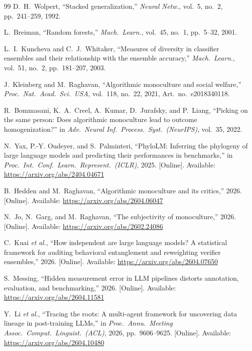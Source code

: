 \documentclass{ieeeaccess}
\theoremstyle{definition}
\theoremstyle{plain}
\begin{document}
\begin{thebibliography}{99}
 D.~H.~Wolpert, ``Stacked generalization,'' \emph{Neural
Netw.}, vol.~5, no.~2, pp.~241--259, 1992.

 L.~Breiman, ``Random forests,'' \emph{Mach.\ Learn.},
vol.~45, no.~1, pp.~5--32, 2001.

 L.~I.~Kuncheva and C.~J.~Whitaker, ``Measures of
diversity in classifier ensembles and their relationship with the ensemble
accuracy,'' \emph{Mach.\ Learn.}, vol.~51, no.~2, pp.~181--207, 2003.

 J.~Kleinberg and M.~Raghavan, ``Algorithmic monoculture
and social welfare,'' \emph{Proc.\ Nat.\ Acad.\ Sci.\ USA}, vol.~118, no.~22,
2021, Art.\ no.\ e2018340118.

 R.~Bommasani, K.~A.~Creel, A.~Kumar, D.~Jurafsky, and
P.~Liang, ``Picking on the same person: Does algorithmic monoculture lead to
outcome homogenization?'' in \emph{Adv.\ Neural Inf.\ Process.\ Syst.\
(NeurIPS)}, vol.~35, 2022.

 N.~Yax, P.-Y. Oudeyer, and S.~Palminteri, ``PhyloLM:
Inferring the phylogeny of large language models and predicting their performances
in benchmarks,'' in \emph{Proc.\ Int.\ Conf.\ Learn.\ Represent.\ (ICLR)}, 2025.
[Online]. Available: \url{https://arxiv.org/abs/2404.04671}

 B.~Hedden and M.~Raghavan, ``Algorithmic monoculture and
its critics,'' 2026. [Online]. Available: \url{https://arxiv.org/abs/2604.06047}

 N.~Jo, N.~Garg, and M.~Raghavan, ``The subjectivity of
monoculture,'' 2026. [Online]. Available: \url{https://arxiv.org/abs/2602.24086}

 C.~Kuai \emph{et al.}, ``How independent are large language
models? A statistical framework for auditing behavioral entanglement and
reweighting verifier ensembles,'' 2026. [Online]. Available:
\url{https://arxiv.org/abs/2604.07650}

 S.~Messing, ``Hidden measurement error in LLM pipelines
distorts annotation, evaluation, and benchmarking,'' 2026. [Online]. Available:
\url{https://arxiv.org/abs/2604.11581}

 Y.~Li \emph{et al.}, ``Tracing the roots: A multi-agent
framework for uncovering data lineage in post-training LLMs,'' in \emph{Proc.\
Annu.\ Meeting Assoc.\ Comput.\ Linguist.\ (ACL)}, 2026, pp.~9606--9625.
[Online]. Available: \url{https://arxiv.org/abs/2604.10480}


\end{thebibliography}
\end{document}
